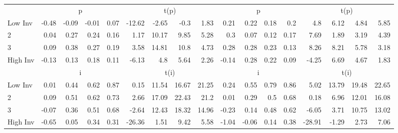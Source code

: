 \begin{table}[!ht]
\begin{tabular}{lrrrrrrrrrrrrrrrr}
  
    
      & \multicolumn{4}{c}{p} & \multicolumn{4}{c}{t(p)}
    
      & \multicolumn{4}{c}{p} & \multicolumn{4}{c}{t(p)}
    
    \\
      \cmidrule(r){2-5} \cmidrule(r){6-9} \cmidrule(r){10-13} \cmidrule(r){14-17}

    Low Inv   & -0.48  & -0.09  & -0.01  & 0.07  & -12.62  & -2.65  & -0.3  & 1.83  & 0.21  & 0.22  & 0.18  & 0.2  & 4.8  & 6.12  & 4.84  & 5.85  \\
           2  & 0.04  & 0.27  & 0.24  & 0.16  & 1.17  & 10.17  & 9.85  & 5.28  & 0.3  & 0.07  & 0.12  & 0.17  & 7.69  & 1.89  & 3.19  & 4.39  \\
           3  & 0.09  & 0.38  & 0.27  & 0.19  & 3.58  & 14.81  & 10.8  & 4.73  & 0.28  & 0.28  & 0.23  & 0.13  & 8.26  & 8.21  & 5.78  & 3.18  \\
    High Inv  & -0.13  & 0.13  & 0.18  & 0.11  & -6.13  & 4.8  & 5.64  & 2.26  & -0.14  & 0.28  & 0.22  & 0.09  & -4.25  & 6.69  & 4.67  & 1.83  \\

  
    
      & \multicolumn{4}{c}{i} & \multicolumn{4}{c}{t(i)}
    
      & \multicolumn{4}{c}{i} & \multicolumn{4}{c}{t(i)}
    
    \\
      \cmidrule(r){2-5} \cmidrule(r){6-9} \cmidrule(r){10-13} \cmidrule(r){14-17}

    Low Inv   & 0.01  & 0.44  & 0.62  & 0.87  & 0.15  & 11.54  & 16.67  & 21.25  & 0.24  & 0.55  & 0.79  & 0.86  & 5.02  & 13.79  & 19.48  & 22.65  \\
           2  & 0.09  & 0.51  & 0.62  & 0.73  & 2.66  & 17.09  & 22.43  & 21.2  & 0.01  & 0.29  & 0.5  & 0.68  & 0.18  & 6.96  & 12.01  & 16.08  \\
           3  & -0.07  & 0.36  & 0.51  & 0.68  & -2.64  & 12.43  & 18.32  & 14.96  & -0.23  & 0.14  & 0.48  & 0.62  & -6.05  & 3.71  & 10.75  & 13.02  \\
    High Inv  & -0.65  & 0.05  & 0.34  & 0.31  & -26.36  & 1.51  & 9.42  & 5.58  & -1.04  & -0.06  & 0.14  & 0.38  & -28.91  & -1.29  & 2.73  & 7.06  \\

  

  \bottomrule
\end{tabular}
\label{tbl:32_Size_OP_Inv_FF2015}
\end{table}